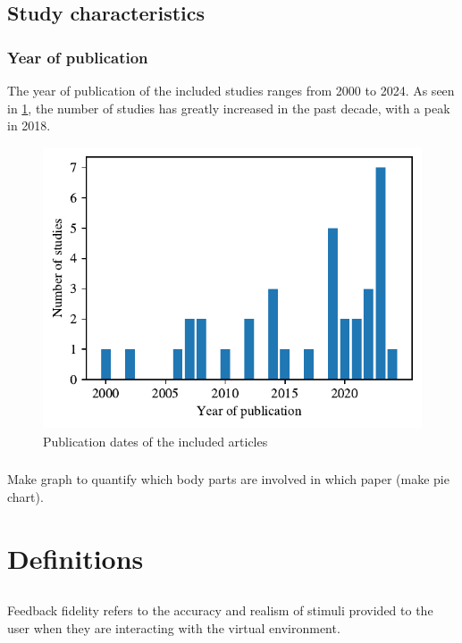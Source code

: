 \subsection{Study characteristics}

\subsubsection{Year of publication}
The year of publication of the included studies ranges from 2000 to 2024. As seen in \ref{fig:years}, the number of studies has greatly increased in the past decade, with a peak in 2018.

\begin{figure}[htbp]
    \centering
    \includegraphics[width=\columnwidth]{figures/years.pdf} 
    \caption{Publication dates of the included articles}
    \label{fig:years}
\end{figure} 

\subsubsection{}
Make graph to quantify which body parts are involved in which paper (make pie chart).


\section{Definitions}
\subsection{}
Feedback fidelity refers to the accuracy and realism of stimuli provided to the user when they are interacting with the virtual environment. 

